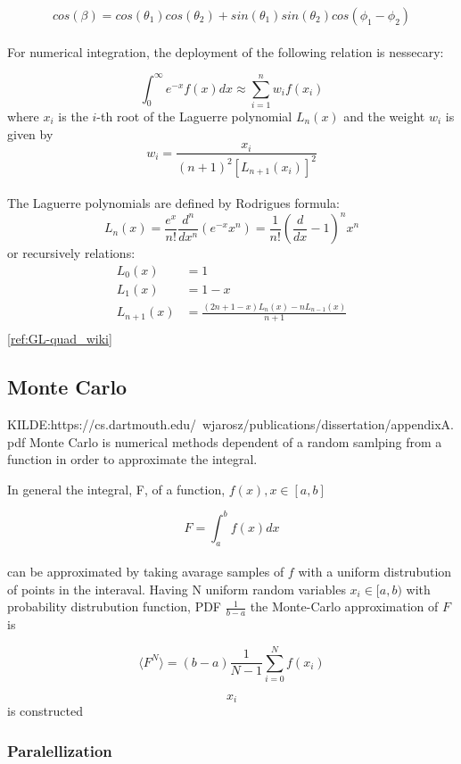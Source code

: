 \documentclass[../main.tex]{subfiles}
\begin{document}
\[cos(\beta) = cos(\theta_1)cos(\theta_2) + sin(\theta_1)sin(\theta_2)cos(\phi_1 - \phi_2)\]
\\

For numerical integration, the deployment of the following relation is nessecary:

\[\int_0^\infty e^{-x}f(x)dx \approx \sum_{i=1}^n w_i f(x_i)\]
where $x_i$ is the $i$-th root of the Laguerre polynomial $L_n(x)$ and the weight $w_i$ is given by
\\
\[w_i = \frac{x_i}{(n+1)^2 [L_{n+1}(x_i)]^2}\]
\\
The Laguerre polynomials are defined by Rodrigues formula:
\[L_n(x) = \frac{e^x}{n!}\frac{d^n}{dx^n}\left(e^{-x} x^n\right) = \frac{1}{n!}\left(\frac{d}{dx}-1\right)^n x^n\]
or recursively relations:
\begin{align*}
  L_0(x) &= 1\\
  L_1(x) &= 1 - x\\
  L_{n+1}(x) &= \frac{(2n + 1 - x)L_n(x) - nL_{n-1}(x)}{n+1}\\
\end{align*}
\ref{ref:GL-quad_wiki}


\subsection{Monte Carlo}
\label{sec:MC}
KILDE:https://cs.dartmouth.edu/~wjarosz/publications/dissertation/appendixA.pdf
Monte Carlo is numerical methods dependent of a random samlping from a function in order to approximate the integral.


In general the integral, F, of a function, $f(x), x\in[a,b]$

\[F = \int_a^b f(x)dx\] \\

can be approximated by taking avarage samples of $f$ with a uniform distrubution of points in the interaval. Having N uniform random variables  $x_i \in [a,b)$ with probability distrubution function, PDF $\frac{1}{b-a}$ the Monte-Carlo approximation of $F$ is


\[\langle F^N \rangle = (b-a)\frac{1}{N-1} \sum_{i=0}^{N}  f(x_i)\]

\[x_i\] is constructed

\subsubsection{Paralellization} \label{sec:theory-Paralellization}
\end{document}
